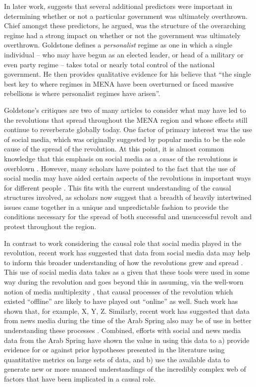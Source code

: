 In later work, \citeauthor{goldstone_bringing_2013} \citeyearpar{goldstone_bringing_2013} suggests that several additional predictors were important in determining whether or not a particular government was ultimately overthrown.  Chief amongst these predictors, he argued, was the structure of the overarching regime had a strong impact on whether or not the government was ultimately overthrown.  Goldstone defines a \emph{personalist} regime as one in which a single individual – who may have begun as an elected leader, or head of a military or even party regime – takes total or nearly total control of the national government. He then provides qualitative evidence for his believe that ``the single best key to where regimes in MENA have been overturned or faced massive rebellions is where personalist regimes have arisen''.
 
Goldstone's critiques are two of many articles to consider what may have led to the revolutions that spread throughout the MENA region and whose effects still continue to reverberate globally today. One factor of primary interest was the use of social media, which was originally suggested by popular media to be the sole cause of the spread of the revolution. At this point, it is almost common knowledge that this emphasis on social media as a \emph{cause} of the revolutions is overblown \citep{bruns_arab_2013,goldstone_bringing_2013,comunello_will_2012}. However, many scholars have pointed to the fact that the use of social media may have aided certain aspects of the revolutions in important ways for different people  \citep{galle_who_2013,starbird_how_2012,lotan_revolutions_2011,tufekci_social_2012}.  This fits with the current understanding of the causal structures involved,  as scholars now suggest that a breadth of heavily intertwined issues came together in a unique and unpredictable fashion to provide the conditions necessary for the spread of both successful and unsuccessful revolt and protest throughout the region. 

In contrast to work considering the causal role that social media played in the revolution, recent work has suggested that data from social media data may help to inform this broader understanding of how the revolutions grew and spread \citep{}.  This use of social media data takes as a given that these tools were used in some way during the revolution and goes beyond this in assuming, via the well-worn notion of media multiplexity \citep{}, that causal processes of the revolution which existed ``offline'' are likely to have played out ``online'' as well.  Such work has shown that, for example, X, Y, Z. Similarly, recent work has suggested that data from news media during the time of the Arab Spring also may be of use in better understanding these processes \citep{joseph_arab_2014,pfeffer_rapid_2012}. Combined, efforts with social and news media data from the Arab Spring have shown the value in using this data to a) provide evidence for or against prior hypotheses presented in the literature using quantitative metrics on large sets of data, and b) use the available data to generate new or more nuanced understandings of the incredibly complex web of factors that have been implicated in a causal role.

